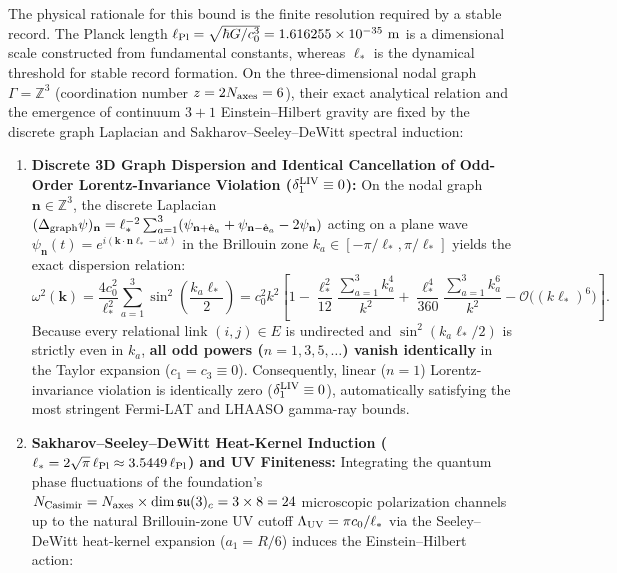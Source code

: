 \documentclass[11pt,a4paper]{article}
\begin{document}
The physical rationale for this bound is the finite resolution required by a stable record. The Planck length $\ell_{\rm Pl} = \sqrt{\hbar G/c_0^3} = 1.616255\times 10^{-35}\text{ m}$ is a dimensional scale constructed from fundamental constants, whereas $\ell_*$ is the dynamical threshold for stable record formation. On the three-dimensional nodal graph $\Gamma = \mathbb{Z}^3$ (coordination number $z = 2 N_{\rm axes} = 6$), their exact analytical relation and the emergence of continuum $3+1$ Einstein--Hilbert gravity are fixed by the discrete graph Laplacian and Sakharov--Seeley--DeWitt spectral induction:
\begin{enumerate}[label=\arabic*.]
\item \textbf{Discrete 3D Graph Dispersion and Identical Cancellation of Odd-Order Lorentz-Invariance Violation ($\delta_1^{\rm LIV} \equiv 0$):} On the nodal graph $\mathbf{n} \in \mathbb{Z}^3$, the discrete Laplacian $(\Delta_{\rm graph}\psi)_{\mathbf{n}} = \ell_*^{-2}\sum_{a=1}^3(\psi_{\mathbf{n}+\hat{\mathbf{e}}_a} + \psi_{\mathbf{n}-\hat{\mathbf{e}}_a} - 2\psi_{\mathbf{n}})$ acting on a plane wave $\psi_{\mathbf{n}}(t) = e^{i(\mathbf{k}\cdot\mathbf{n}\ell_* - \omega t)}$ in the Brillouin zone $k_a \in [-\pi/\ell_*, \pi/\ell_*]$ yields the exact dispersion relation:
\begin{equation}
\omega^2(\mathbf{k}) = \frac{4 c_0^2}{\ell_*^2}\sum_{a=1}^3 \sin^2\!\left(\frac{k_a\ell_*}{2}\right) = c_0^2 k^2\left[1 - \frac{\ell_*^2}{12}\frac{\sum_{a=1}^3 k_a^4}{k^2} + \frac{\ell_*^4}{360}\frac{\sum_{a=1}^3 k_a^6}{k^2} - \mathcal{O}\bigl((k\ell_*)^6\bigr)\right].
\end{equation}
Because every relational link $(i,j)\in E$ is undirected and $\sin^2(k_a\ell_*/2)$ is strictly even in $k_a$, \textbf{all odd powers ($n=1, 3, 5, \dots$) vanish identically} in the Taylor expansion ($c_1 = c_3 \equiv 0$). Consequently, linear ($n=1$) Lorentz-invariance violation is identically zero ($\delta_1^{\rm LIV} \equiv 0$), automatically satisfying the most stringent Fermi-LAT and LHAASO gamma-ray bounds.
\item \textbf{Sakharov--Seeley--DeWitt Heat-Kernel Induction ($\ell_* = 2\sqrt{\pi}\,\ell_{\rm Pl} \approx 3.5449\,\ell_{\rm Pl}$) and UV Finiteness:} Integrating the quantum phase fluctuations of the foundation's $N_{\rm Casimir} = N_{\rm axes}\times\dim\mathfrak{su}(3)_c = 3\times 8 = 24$ microscopic polarization channels up to the natural Brillouin-zone UV cutoff $\Lambda_{\rm UV} = \pi c_0/\ell_*$ via the Seeley--DeWitt heat-kernel expansion ($a_1 = R/6$) induces the Einstein--Hilbert action:

\end{enumerate}
\end{document}
